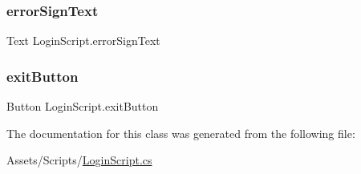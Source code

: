 \mbox{\label{classLoginScript_a787ac0e67c037d5de9360313b597eb5e}} 
\subsubsection{\texorpdfstring{error\+Sign\+Text}{errorSignText}}
{\footnotesize\ttfamily Text Login\+Script.\+error\+Sign\+Text}

\mbox{\label{classLoginScript_a885b1db86ae5ebd841652880d4dbcb0d}} 
\subsubsection{\texorpdfstring{exit\+Button}{exitButton}}
{\footnotesize\ttfamily Button Login\+Script.\+exit\+Button}



The documentation for this class was generated from the following file\+:\begin{DoxyCompactItemize}
\item 
Assets/\+Scripts/\hyperlink{LoginScript_8cs}{Login\+Script.\+cs}\end{DoxyCompactItemize}
